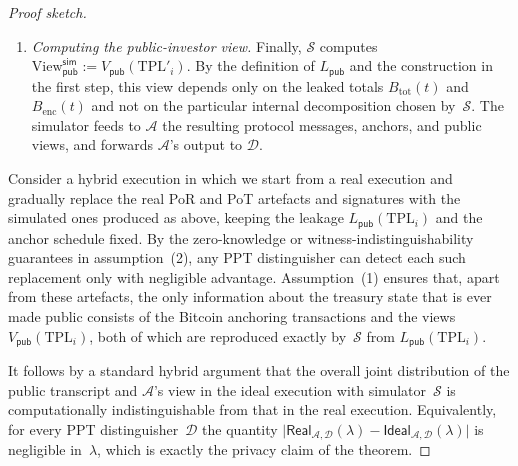 \documentclass[11pt]{article}
\begin{document}
\begin{proof}[Proof sketch]
\begin{enumerate}[noitemsep]
  \item \emph{Computing the public-investor view.}
        Finally, $\mathcal{S}$ computes
        $\mathrm{View}^{\mathsf{sim}}_{\mathsf{pub}}
          := V_{\mathsf{pub}}(\mathrm{TPL}'_i)$.
        By the definition of $L_{\mathsf{pub}}$ and the construction in the
        first step, this view depends only on the leaked totals
        $B_{\mathrm{tot}}(t)$ and $B_{\mathrm{enc}}(t)$ and not on the
        particular internal decomposition chosen by~$\mathcal{S}$.
        The simulator feeds to $\mathcal{A}$ the resulting protocol messages,
        anchors, and public views, and forwards $\mathcal{A}$'s output to
        $\mathcal{D}$.
\end{enumerate}

Consider a hybrid execution in which we start from a real execution and
gradually replace the real PoR and PoT artefacts and signatures with the
simulated ones produced as above, keeping the leakage
$L_{\mathsf{pub}}(\mathrm{TPL}_i)$ and the anchor schedule fixed.
By the zero-knowledge or witness-indistinguishability guarantees in
assumption~(2), any PPT distinguisher can detect each such replacement only
with negligible advantage.
Assumption~(1) ensures that, apart from these artefacts, the only information
about the treasury state that is ever made public consists of the Bitcoin
anchoring transactions and the views $V_{\mathsf{pub}}(\mathrm{TPL}_i)$, both
of which are reproduced exactly by~$\mathcal{S}$ from
$L_{\mathsf{pub}}(\mathrm{TPL}_i)$.

It follows by a standard hybrid argument that the overall joint distribution
of the public transcript and $\mathcal{A}$'s view in the ideal execution with
simulator~$\mathcal{S}$ is computationally indistinguishable from that in the
real execution.
Equivalently, for every PPT distinguisher~$\mathcal{D}$ the quantity
$\bigl|
  \mathsf{Real}_{\mathcal{A},\mathcal{D}}(\lambda)
  - \mathsf{Ideal}_{\mathcal{A},\mathcal{D}}(\lambda)
\bigr|$
is negligible in~$\lambda$, which is exactly the privacy claim of the theorem.
\end{proof}
\end{document}
